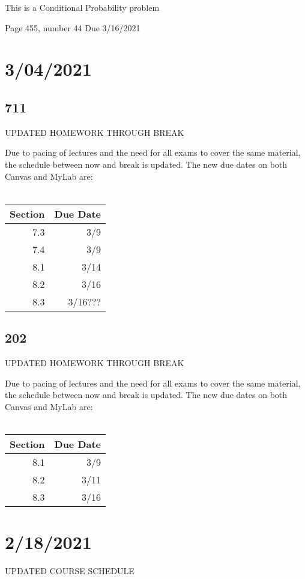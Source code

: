 \documentclass[]{article}
\begin{document}
This is a Conditional Probability problem

Page 455, number 44
Due 3/16/2021
	
\section*{3/04/2021}
\subsection*{711}
UPDATED HOMEWORK THROUGH BREAK

Due to pacing of lectures and the need for all exams to cover the same material, the schedule between now and break is updated. The new due dates on both Canvas and MyLab are:\\\\
\bgroup
\def\arraystretch{1.5}
\begin{tabular}{|r|r|}
	\hline
	Section & Due Date \\
	\hline
	7.3 & 3/9 \\
	\hline
	7.4 & 3/9 \\
	\hline
	8.1 & 3/14 \\
	\hline
	8.2 & 3/16 \\
	\hline
	8.3 & 3/16??? \\
	\hline
\end{tabular}
\egroup

\subsection*{202}
UPDATED HOMEWORK THROUGH BREAK

Due to pacing of lectures and the need for all exams to cover the same material, the schedule between now and break is updated. The new due dates on both Canvas and MyLab are:\\\\
\bgroup
\def\arraystretch{1.5}
\begin{tabular}{|r|r|}
	\hline
	Section & Due Date \\
	\hline
	8.1 & 3/9 \\
	\hline
	8.2 & 3/11 \\
	\hline
	8.3 & 3/16 \\
	\hline
\end{tabular}
\egroup

	
\section*{2/18/2021}
UPDATED COURSE SCHEDULE
\end{document}
